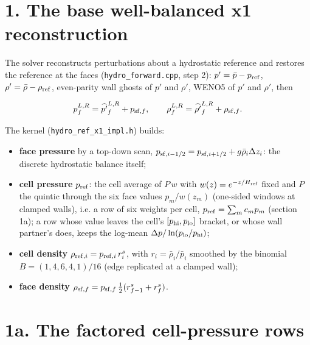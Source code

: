 \documentclass[11pt,a4paper]{article}
\begin{document}
\section*{1. The base well-balanced x1 reconstruction}

The solver reconstructs perturbations about a hydrostatic reference and restores the reference at the faces
(\texttt{hydro\_forward.cpp}, step 2): $p' = \bar p - p_{\rm ref}$, $\rho' = \bar\rho - \rho_{\rm ref}$, even-parity
wall ghosts of $p'$ and $\rho'$, WENO5 of $p'$ and $\rho'$, then

\begin{equation*}
p^{L,R}_f = \widehat{p'}^{L,R}_f + p_{{\rm sf},f}, \qquad \rho^{L,R}_f = \widehat{\rho'}^{L,R}_f + \rho_{{\rm sf},f} .
\end{equation*}

The kernel (\texttt{hydro\_ref\_x1\_impl.h}) builds:

\begin{itemize}
\item \textbf{face pressure} by a top-down scan, $p_{{\rm sf},i-1/2} = p_{{\rm sf},i+1/2} + g\bar\rho_i\Delta z_i$: the
  discrete hydrostatic balance itself;
\item \textbf{cell pressure} $p_{\rm ref}$: the cell average of $P\,w$ with $w(z) = e^{-z/H_{\rm ref}}$ fixed and $P$ the
  quintic through the six face values $p_m/w(z_m)$ (one-sided windows at clamped walls), i.e. a row of six
  weights per cell, $p_{\rm ref} = \sum_m c_m p_m$ (section 1a); a row whose value leaves the cell's
  $[p_{\rm hi}, p_{\rm lo}]$ bracket, or whose wall partner's does, keeps the log-mean
  $\Delta p / \ln(p_{\rm lo}/p_{\rm hi})$;
\item \textbf{cell density} $\rho_{{\rm ref},i} = p_{{\rm ref},i}\, r^s_i$, with $r_i = \bar\rho_i/\bar p_i$ smoothed by the
  binomial $B = (1, 4, 6, 4, 1)/16$ (edge replicated at a clamped wall);
\item \textbf{face density} $\rho_{{\rm sf},f} = p_{{\rm sf},f}\,\tfrac12(r^s_{f-1} + r^s_f)$.
\end{itemize}

\section*{1a. The factored cell-pressure rows}
\end{document}
